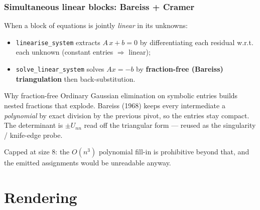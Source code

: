 \documentclass[10pt,slidestop]{beamer}
\newcommand{\code}[1]{\texttt{#1}}
\begin{document}
\begin{frame}\frametitle{Simultaneous linear blocks: Bareiss + Cramer}
  When a block of equations is jointly \emph{linear} in its unknowns:

  \begin{itemize}
  \item \code{linearise\_system} extracts $A\,x + b = 0$ by differentiating each
    residual w.r.t. each unknown (constant entries $\Rightarrow$ linear);\newline
  \item \code{solve\_linear\_system} solves $A x = -b$ by
    \textbf{fraction-free (Bareiss) triangulation} then back-substitution.
  \end{itemize}

  \begin{block}{Why fraction-free}
    Ordinary Gaussian elimination on symbolic entries builds nested fractions
    that explode. Bareiss (1968) keeps every intermediate a \emph{polynomial} by
    exact division by the previous pivot, so the entries stay compact. The
    determinant is $\pm U_{nn}$ read off the triangular form --- reused as the
    singularity / knife-edge probe.
  \end{block}

  Capped at size 8: the $O(n^3)$ polynomial fill-in is prohibitive beyond that,
  and the emitted assignments would be unreadable anyway.
\end{frame}

\section{Rendering}
\end{document}
